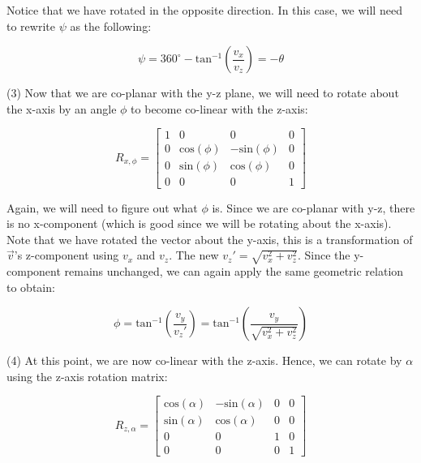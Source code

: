 \documentclass[12pt,letterpaper]{article}
\begin{document}
Notice that we have rotated in the opposite direction. In this case, we will need to rewrite $\psi$ as the following:

\begin{equation}
    \psi = 360^{\circ}-\text{tan}^{-1}(\frac{v_x}{v_z}) = -\theta
\end{equation}

(3) Now that we are co-planar with the y-z plane, we will need to rotate about the x-axis by an angle $\phi$ to become co-linear with the z-axis:

\begin{equation}
    R_{x, \phi} = \begin{bmatrix}
        1 & 0 & 0 & 0 \\
        0 & \text{cos}(\phi) & -\text{sin}(\phi) & 0 \\
        0 & \text{sin}(\phi) &  \text{cos}(\phi) & 0 \\
        0 & 0 & 0 & 1
    \end{bmatrix}
\end{equation}

Again, we will need to figure out what $\phi$ is. Since we are co-planar with y-z, there is no x-component (which is good since we will be rotating about the x-axis). Note that we have rotated the vector about the y-axis, this is a transformation of $\overrightarrow{v}$'s z-component using $v_x$ and $v_z$. The new $v_z' = \sqrt{v_x^2+v_z^2}$. Since the y-component remains unchanged, we can again apply the same geometric relation to obtain:

\begin{equation}
    \phi = \text{tan}^{-1}(\frac{v_y}{v_z'}) = \text{tan}^{-1}(\frac{v_y}{\sqrt{v_x^2+v_z^2}})
\end{equation}

(4) At this point, we are now co-linear with the z-axis. Hence, we can rotate by $\alpha$ using the z-axis rotation matrix:

\begin{equation}
    R_{z, \alpha} = \begin{bmatrix}
        \text{cos}(\alpha) & -\text{sin}(\alpha) & 0 & 0 \\
        \text{sin}(\alpha) &  \text{cos}(\alpha) & 0 & 0 \\
        0 & 0 & 1 & 0 \\
        0 & 0 & 0 & 1
    \end{bmatrix}
\end{equation}
\end{document}
